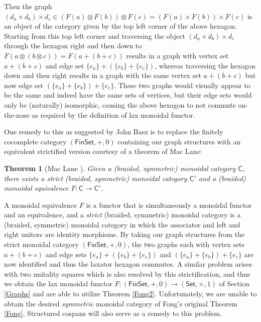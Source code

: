 \documentclass[oneside,final]{ucr}
\newtheorem{theorem}{Theorem}[section]
\theoremstyle{definition}
\begin{document}
{\[\]
Then the graph $(d_a \times d_b) \times d_c \in (F(a) \otimes F(b)) \otimes F(c) = (F(a) \times F(b)) \times F(c)$ is an object of the category given by the top left corner of the above hexagon. Starting from this top left corner and traversing the object $(d_a \times d_b) \times d_c$ through the hexagon right and then down to $F(a \otimes (b \otimes c))=F(a + (b + c))$ results in a graph with vertex set $a+(b+c)$ and edge set $\{e_a\} + (\{e_b\} + \{e_c\})$, whereas traversing the hexagon down and then right results in a graph with the same vertex set $a+(b+c)$ but now edge set $(\{e_a\}+\{e_b\}) + \{e_c\}$. These two graphs would visually appear to be the same and indeed have the same sets of vertices, but their edge sets would only be (naturally) isomorphic, causing the above hexagon to not commute on-the-nose as required by the definition of lax monoidal functor.

One remedy to this as suggested by John Baez is to replace the finitely cocomplete category $(\mathsf{FinSet},+,0)$ containing our graph structures with an equivalent strictified version courtesy of a theorem of Mac Lane:

\begin{theorem}[Mac Lane \cite{ML}]\label{Mac Lane}
Given a (braided, symmetric) monoidal category $\mathsf{C}$, there exists a strict (braided, symmetric) monoidal category $\mathsf{C}'$ and a (braided) monoidal equivalence $F \colon \mathsf{C} \to \mathsf{C}'$. 
\end{theorem}

A monoidal equivalence $F$ is a functor that is simultaneously a monoidal functor and an equivalence, and a \emph{strict} (braided, symmetric) monoidal category is a (braided, symmetric) monoidal category in which the associator and left and right unitors are identity morphisms. By taking our graph structures from the strict monoidal category $(\mathsf{FinSet},+,0)$, the two graphs each with vertex sets $a+(b+c)$ and edge sets $\{e_a\} + (\{e_b\} + \{e_c\})$ and $(\{e_a\} + \{e_b\}) + \{e_c\}$ are now identified and thus the laxator hexagon commutes. A similar problem arises with two unitality squares which is also resolved by this strictification, and thus we obtain the lax monoidal functor $F \colon (\mathsf{FinSet},+,0) \to (\mathsf{Set},\times,1)$ of 
Section \ref{Graphs} and are able to utilize Theorem \ref{Fong2}. Unfortunately, we are unable to obtain the desired \emph{symmetric} monoidal category of Fong's original Theorem \ref{Fong}. Structured cospans will also serve as a remedy to this problem.


}
\end{document}
